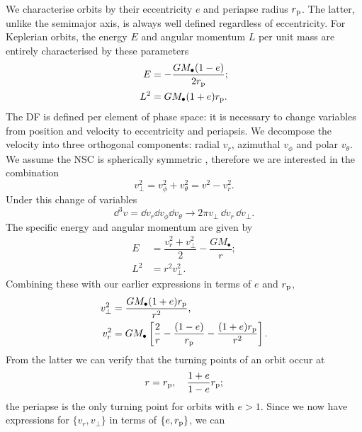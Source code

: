 We characterise orbits by their eccentricity $e$ and periapse radius $r_\mathrm{p}$. The latter, unlike the semimajor axis, is always well defined regardless of eccentricity. For Keplerian orbits, the energy $E$ and angular momentum $L$ per unit mass are entirely characterised by these parameters
\begin{equation}
\label{eq:Energy_ecc}
\begin{split}
E & = -\dfrac{GM_\bullet(1 - e)}{2r_\mathrm{p}}; \\
L^2 & = GM_\bullet(1 + e)r_\mathrm{p}.
\end{split}
\end{equation}
The DF is defined per element of phase space: it is necessary to change variables from position and velocity to eccentricity and periapsis. We decompose the velocity into three orthogonal components: radial $v_r$, azimuthal $v_\phi$ and polar $v_\theta$. We assume the NSC is spherically symmetric \citep{Genzel2003, Schodel2007}, therefore we are interested in the combination
\begin{equation}
v_\perp^2 = v_\phi^2 + v_\theta^2 = v^2 - v_r^2.
\end{equation}
Under this change of variables
\begin{equation}
\dd^3v = \dd v_r \dd v_\phi \dd v_\theta \rightarrow 2\pi v_\perp \,\dd v_r \,\dd v_\perp.
\end{equation}
The specific energy and angular momentum are given by
\begin{equation}
\begin{split}
E & = \dfrac{v_r^2 + v_\perp^2}{2} - \dfrac{GM_\bullet}{r}; \\
L^2 & = r^2 v_\perp^2.
\end{split}
\end{equation}
Combining these with our earlier expressions in terms of $e$ and $r_\mathrm{p}$,
\begin{align}
v_\perp^2 = {} & \dfrac{GM_\bullet(1 + e)r_\mathrm{p}}{r^2}, \\
v_r^2 = {} & GM_\bullet\left[\dfrac{2}{r} - \dfrac{(1 - e)}{r_\mathrm{p}} - \dfrac{(1 + e)r_\mathrm{p}}{r^2}\right].
\end{align}
From the latter we can verify that the turning points of an orbit occur at
\begin{equation}
r = r_\mathrm{p}, \quad \dfrac{1+e}{1-e}r_\mathrm{p};
\end{equation}
the periapse is the only turning point for orbits with $e > 1$. Since we now have expressions for $\{v_r, v_\perp\}$ in terms of $\{e, r_\mathrm{p}\}$, we can 
